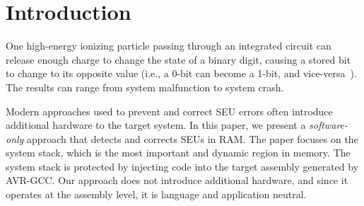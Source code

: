 \vspace{-5pt}
\section{Introduction}\label{sec:introduction}
\vspace{-10pt}

One high-energy ionizing particle passing through an integrated circuit can release enough charge to change the state of a binary digit, causing a stored bit to change to its opposite value (i.e., a 0-bit can become a 1-bit, and vice-versa~\cite{fundamentals:space}). The results can range from system malfunction to system crash.

Modern approaches used to prevent and correct SEU errors often introduce additional hardware to the target system. In this paper, we present a {\em software-only} approach that detects and corrects SEUs in RAM. The paper focuses on the system stack, which is the most important and dynamic region in memory. The system stack is protected by injecting code into the target assembly generated by AVR-GCC. Our approach does not introduce additional hardware, and since it operates at the assembly level, it is language and application neutral. 